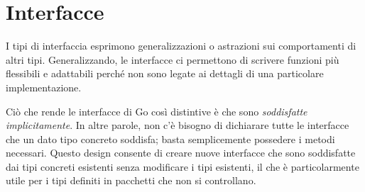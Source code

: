 \documentclass[../thesis.tex]{subfiles}
\begin{document}
    \newpage


    \section{Interfacce}\label{sec:interfacce}
    I tipi di interfaccia esprimono generalizzazioni o astrazioni sui comportamenti di altri tipi.
    Generalizzando, le interfacce ci permettono di scrivere funzioni più flessibili e adattabili perché non sono legate ai dettagli di una particolare implementazione.
    \hfill \vspace{12pt}

    Ciò che rende le interfacce di Go così distintive è che sono \textit{soddisfatte implicitamente}.
    In altre parole, non c'è bisogno di dichiarare tutte le interfacce che un dato tipo concreto soddisfa;
    basta semplicemente possedere i metodi necessari.
    Questo design consente di creare nuove interfacce che sono soddisfatte dai tipi concreti esistenti senza modificare i tipi esistenti, il che è particolarmente utile per i tipi definiti in pacchetti che non si controllano.
    
    
    
    
    
    
    \clearpage
\end{document}
